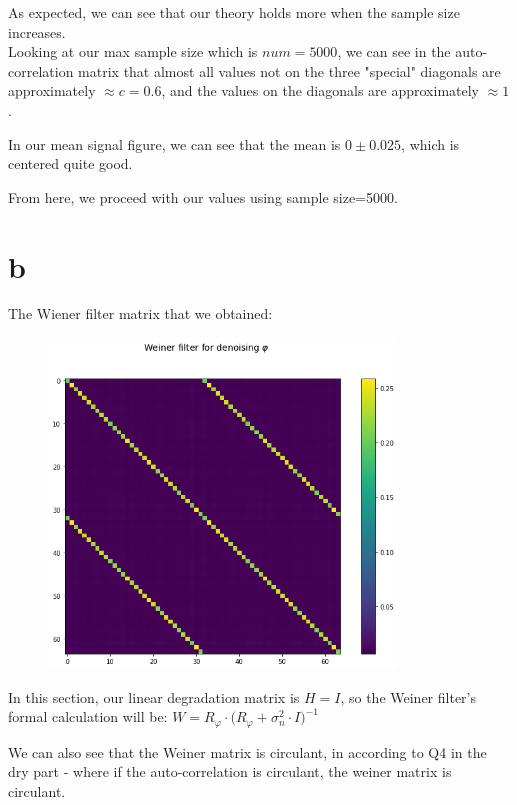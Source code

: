\documentclass[a4paper]{article}
\begin{document}
As expected, we can see that our theory holds more when the sample size increases. \\
Looking at our max sample size which is $num=5000$, we can see in the auto-correlation matrix that almost all values not on the three "special" diagonals are approximately $\approx c=0.6$, and the values on the diagonals are approximately $\approx 1$. 

In our mean signal figure, we can see that the mean is $0\pm 0.025$, which is centered quite good.

From here, we proceed with our values using sample size=5000.


\section*{b}

The Wiener filter matrix that we obtained:

\begin{figure}[h]
    \centering
    \includegraphics[width=350,keepaspectratio]{p2q1b_weiner.png}
\end{figure}

In this section, our linear degradation matrix is $H=I$, so the Weiner filter's formal calculation will be: $W=R_\varphi \cdot \big( R_\varphi + \sigma_n^2 \cdot I \big) ^ {-1}$

We can also see that the Weiner matrix is circulant, in according to Q4 in the dry part - where if the auto-correlation is circulant, the weiner matrix is circulant.
\end{document}
